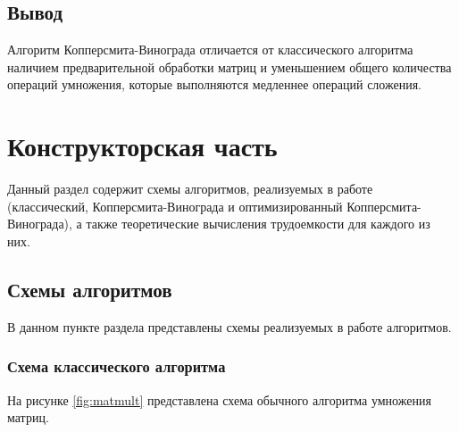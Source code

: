 \documentclass[12pt]{report}
\begin{document}
    \section{Вывод}
    Алгоритм Копперсмита-Винограда отличается от классического алгоритма наличием
    предварительной обработки матриц и уменьшением общего количества операций умножения,
    которые выполняются медленнее операций сложения.
    \newpage


    \chapter{Конструкторская часть}
    Данный раздел содержит схемы алгоритмов, реализуемых в работе
    (классический, Копперсмита-Винограда и оптимизированный Копперсмита-Винограда),
    а также теоретические вычисления трудоемкости для каждого из них.


    \section{Схемы алгоритмов}
    В данном пункте раздела представлены схемы реализуемых в работе алгоритмов.

    \subsection{Схема классического алгоритма}
    На рисунке \ref{fig:matmult} представлена схема обычного алгоритма умножения матриц.
\end{document}
